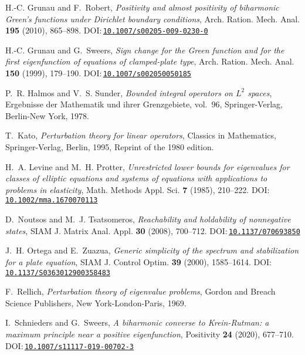 \documentclass[a4paper, reqno,titlepage]{amsart}
\numberwithin{equation}{section}
\theoremstyle{plain}
\theoremstyle{definition}
\theoremstyle{remark}
\begin{document}
\begin{thebibliography}{10}
H.-C. Grunau and F.~Robert, \emph{Positivity and almost positivity of
  biharmonic {G}reen's functions under {D}irichlet boundary conditions}, Arch.
  Ration. Mech. Anal. \textbf{195} (2010), 865--898.
  DOI:\,\href{https://doi.org/10.1007/s00205-009-0230-0}{\nolinkurl{10.1007/s00205-009-0230-0}}

H.-C. Grunau and G.~Sweers, \emph{Sign change for the {G}reen function and for
  the first eigenfunction of equations of clamped-plate type}, Arch. Ration.
  Mech. Anal. \textbf{150} (1999), 179--190.
  DOI:\,\href{https://doi.org/10.1007/s002050050185}{\nolinkurl{10.1007/s002050050185}}

P.~R. Halmos and V.~S. Sunder, \emph{Bounded integral operators on {$L^{2}$}
  spaces}, Ergebnisse der Mathematik und ihrer Grenzgebiete, vol.~96,
  Springer-Verlag, Berlin-New York, 1978.

T.~Kato, \emph{Perturbation theory for linear operators}, Classics in
  Mathematics, Springer-Verlag, Berlin, 1995, Reprint of the 1980 edition.

H.~A. Levine and M.~H. Protter, \emph{Unrestricted lower bounds for eigenvalues
  for classes of elliptic equations and systems of equations with applications
  to problems in elasticity}, Math. Methods Appl. Sci. \textbf{7} (1985),
  210--222.
  DOI:\,\href{https://doi.org/10.1002/mma.1670070113}{\nolinkurl{10.1002/mma.1670070113}}

D.~Noutsos and M.~J. Tsatsomeros, \emph{Reachability and holdability of
  nonnegative states}, SIAM J. Matrix Anal. Appl. \textbf{30} (2008), 700--712.
  DOI:\,\href{https://doi.org/10.1137/070693850}{\nolinkurl{10.1137/070693850}}

J.~H. Ortega and E.~Zuazua, \emph{Generic simplicity of the spectrum and
  stabilization for a plate equation}, SIAM J. Control Optim. \textbf{39}
  (2000), 1585--1614.
  DOI:\,\href{https://doi.org/10.1137/S0363012900358483}{\nolinkurl{10.1137/S0363012900358483}}

F.~Rellich, \emph{Perturbation theory of eigenvalue problems}, Gordon and
  Breach Science Publishers, New York-London-Paris, 1969.

I.~Schnieders and G.~Sweers, \emph{A biharmonic converse to {K}rein-{R}utman: a
  maximum principle near a positive eigenfunction}, Positivity \textbf{24}
  (2020), 677--710.
  DOI:\,\href{https://doi.org/10.1007/s11117-019-00702-3}{\nolinkurl{10.1007/s11117-019-00702-3}}


\end{thebibliography}
\end{document}
